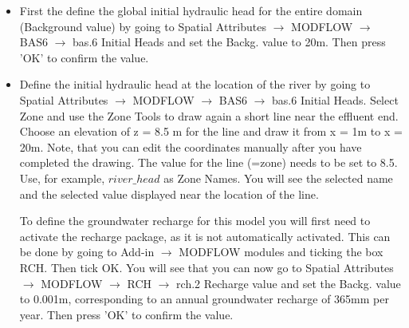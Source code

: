 \begin{itemize}
By setting the boundary condition type to -1 the hydraulic head at the grid cells 
near the defined line will remain unchanged
over the entire simulation period, i.e., it will remain at the value that corresponds to the elevation of
the river water level. In the next step the initial heads need to be defined. 

\item First the define the global initial hydraulic head for the entire domain (Background value) by going to {\color{blue}Spatial Attributes} $\rightarrow$ {\color{blue}MODFLOW} $\rightarrow$ {\color{blue}BAS6} $\rightarrow$ {\color{blue}bas.6 Initial Heads} and set the
 {\color{blue}Backg.} value to 20m. Then press {\color{blue}'OK'} to confirm the value.  

\item Define the initial hydraulic head at the location of the river by going to {\color{blue}Spatial Attributes} $\rightarrow$ {\color{blue}MODFLOW} $\rightarrow$ {\color{blue}BAS6} $\rightarrow$ {\color{blue}bas.6 Initial Heads}.
Select {\color{blue}Zone} and use the {\color{blue}Zone Tools} to draw again a short line near the effluent end. Choose an elevation of z = 8.5 m for the line and draw it from x = 1m to x = 20m. 
Note, that you can edit the coordinates manually after you have completed the drawing.
The value for the line (=zone) needs to be set to 8.5. Use, for example,
$river\_head$ as {\color{blue}Zone Names}. You will see the selected name and the selected value
displayed near the location of the line.
  

To define the groundwater recharge for this model you will first need to activate the recharge package,
as it is not automatically activated.
This can be done by going to {\color{blue}Add-in} $\rightarrow$ {\color{blue}MODFLOW modules} 
and ticking the box {\color{blue}RCH}. Then tick {\color{blue}OK}.
You will see that you can now go to {\color{blue}Spatial Attributes} $\rightarrow$ {\color{blue}MODFLOW} $\rightarrow$ {\color{blue}RCH} $\rightarrow$ {\color{blue}rch.2 Recharge value} and set the {\color{blue}Backg.} value to 0.001m, corresponding to an annual groundwater recharge of 365mm per year.
Then press {\color{blue}'OK'} to confirm the value. 



\end{itemize}

